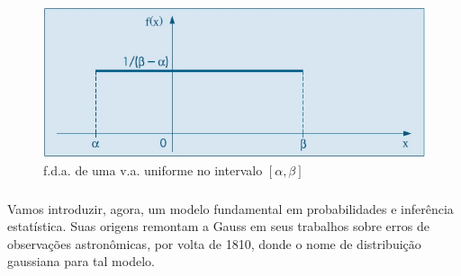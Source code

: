 \documentclass[14pt,aspectratio=1610]{beamer}
\begin{document}
\begin{frame}{}
\frametitle{}
\begin{block}{}
\justifying
\begin{figure}[H]
    \centering
    \includegraphics[scale=0.5]{figs/uniform}
    \caption{f.d.a. de uma v.a. uniforme no intervalo $[\alpha,\beta]$}
  \end{figure}
\end{block}
\end{frame}

\begin{frame}{}
\frametitle{}
\begin{block}{}
\justifying
Vamos introduzir, agora, um modelo fundamental em probabilidades e inferência estatística. Suas origens remontam a Gauss em seus trabalhos sobre erros de observações astronômicas, por volta de 1810, donde o nome de distribuição gaussiana para tal modelo.
\end{block}
\end{frame}
\end{document}

